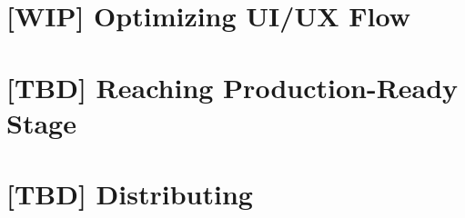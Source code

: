 \documentclass[12pt, a4paper, twoside]{extreport}
\begin{document}
\newpage
\section{[WIP] Optimizing UI/UX Flow}




\newpage
\section{[TBD] Reaching Production-Ready Stage}


\newpage
\section{[TBD] Distributing}







\thispagestyle{empty}



~
\end{document}
